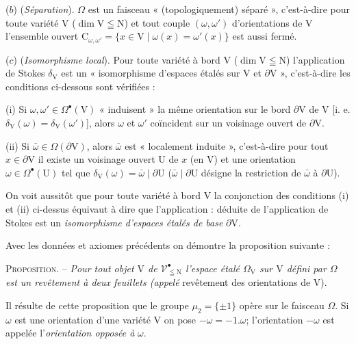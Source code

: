 ($b$) (\textit{Séparation}). $\Omega$ est un faisceau « (topologiquement) séparé », c'est-à-dire pour toute variété $\mathrm V$ ($\dim\mathrm V\leqq\mathrm N$) et tout couple $(\omega,\omega')$ d'orientations de $\mathrm V$ l'ensemble ouvert $\mathrm C_{\omega,\omega'}=\{x\in\mathrm V\mid\omega(x)=\omega'(x)\}$ est aussi fermé.

($c$) (\textit{Isomorphisme local}). Pour toute variété à bord $\mathrm V$ ($\dim\mathrm V\leqq\mathrm N$) l'application de Stokes $\delta_{\mathrm V}$ est un « isomorphisme d'espaces étalés sur $\mathrm V$ et $\partial\mathrm V$ », c'est-à-dire les conditions ci-dessous sont vérifiées :

(i) Si $\omega,\omega'\in\Omega^\bullet(\mathrm V)$ « induisent » la même orientation sur le bord $\partial\mathrm V$ de $\mathrm V$ [i. e. $\delta_{\mathrm V}(\omega)=\delta_{\mathrm V}(\omega')$], alors $\omega$ et $\omega'$ coïncident sur un voisinage ouvert de $\partial\mathrm V$.

(ii) Si $\bar\omega\in\Omega(\partial\mathrm V)$, alors $\bar\omega$ est « localement induite », c'est-à-dire pour tout $x\in\partial\mathrm V$ il existe un voisinage ouvert $\mathrm U$ de $x$ (en $\mathrm V$) et une orientation $\omega\in\Omega^\bullet(\mathrm U)$ tel que $\delta_{\mathrm V}(\omega)=\bar\omega\mid\partial\mathrm U$ ($\bar\omega\mid\partial\mathrm U$ désigne la restriction de $\bar\omega$ à $\partial\mathrm U$).

On voit aussitôt que pour toute variété à bord $\mathrm V$ la conjonction des conditions (i) et (ii) ci-dessus équivaut à dire que l'application :
déduite de l'application de Stokes est un \textit{isomorphisme d'espaces étalés de base} $\partial\mathrm V$.

Avec les données et axiomes précédents on démontre la proposition suivante :

\textsc{Proposition}. -- \textit{Pour tout objet $\mathrm V$ de $\mathcal V^\bullet_{\leqq\mathrm N}$ l'espace étalé $\Omega_{\mathrm V}$ sur $\mathrm V$ défini par $\Omega$ est un revêtement à deux feuillets (appelé} revêtement des orientations de $\mathrm V$).

Il résulte de cette proposition que le groupe $\mu_2=\{\pm1\}$ opère sur le faisceau $\Omega$. Si $\omega$ est une orientation d'une variété $\mathrm V$ on pose $-\omega=-1.\omega$; l'orientation $-\omega$ est appelée l'\textit{orientation opposée à} $\omega$.

